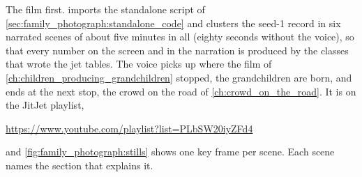 The film first. 
imports the standalone script of \cref{sec:family_photograph:standalone_code}
and clusters the seed-1 record in six narrated scenes of about five
minutes in all (eighty seconds without the voice), so that every number
on the screen and in the narration is produced by the classes that wrote
the jet tables. The voice picks up where the film of
\cref{ch:children_producing_grandchildren} stopped, the grandchildren are
born, and ends at the next stop, the crowd on the road of
\cref{ch:crowd_on_the_road}. It is on the JitJet playlist,
\begin{center}
  \url{https://www.youtube.com/playlist?list=PLbSW20iyZFd4}
\end{center}
and \cref{fig:family_photograph:stills} shows one key frame per scene.
Each scene names the section that explains it.
